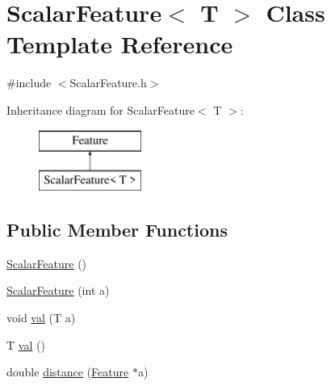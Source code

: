 \hypertarget{class_scalar_feature}{\section{Scalar\+Feature$<$ T $>$ Class Template Reference}
\label{class_scalar_feature}
}


{\ttfamily \#include $<$Scalar\+Feature.\+h$>$}

Inheritance diagram for Scalar\+Feature$<$ T $>$\+:\begin{figure}[H]
\begin{center}
\leavevmode
\includegraphics[height=2.000000cm]{class_scalar_feature}
\end{center}
\end{figure}
\subsection*{Public Member Functions}
\begin{DoxyCompactItemize}
\item 
\hyperlink{class_scalar_feature_aa1daecc3065ef533e347b81290b710e3}{Scalar\+Feature} ()
\item 
\hyperlink{class_scalar_feature_ace56cbb8d2624c2f8eb9a0d2f9fc7873}{Scalar\+Feature} (int a)
\item 
void \hyperlink{class_scalar_feature_ac8f206ffcbb1c71d4ac5877193d2d26b}{val} (T a)
\item 
T \hyperlink{class_scalar_feature_a504181db619359cb45ab8e2de509fb6e}{val} ()
\item 
double \hyperlink{class_scalar_feature_a5b95859a0d7409d7d9306a0c262e8e17}{distance} (\hyperlink{class_feature}{Feature} $\ast$a)
\end{DoxyCompactItemize}


